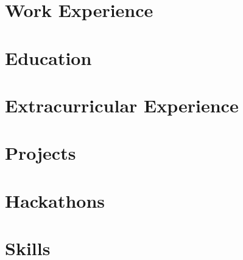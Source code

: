 \documentclass[letter,10pt]{article}
\begin{document}
% 

\section{Work Experience}


\section{Education}


\section{Extracurricular Experience}



\section{Projects}


\section{Hackathons}



\section{Skills}



\end{document}
